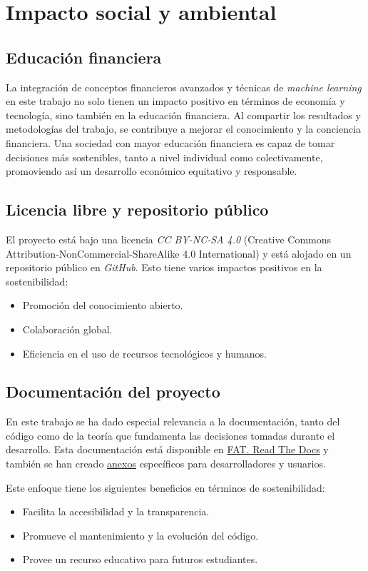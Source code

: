 \section{Impacto social y ambiental}

\subsection{Educación financiera}

La integración de conceptos financieros avanzados y técnicas de \emph{machine learning} en este trabajo no solo tienen un impacto positivo en términos de economía y tecnología, sino también en la educación financiera. Al compartir los resultados y metodologías del trabajo, se contribuye a mejorar el conocimiento y la conciencia financiera. Una sociedad con mayor educación financiera es capaz de tomar decisiones más sostenibles, tanto a nivel individual como colectivamente, promoviendo así un desarrollo económico equitativo y responsable.

\subsection{Licencia libre y repositorio público}

El proyecto está bajo una licencia \emph{CC BY-NC-SA 4.0} (Creative Commons Attribution-NonCommercial-ShareAlike 4.0 International) y está alojado en un repositorio público en \emph{GitHub}. Esto tiene varios impactos positivos en la sostenibilidad:

\begin{itemize}
\item
Promoción del conocimiento abierto.
\item
Colaboración global.
\item
Eficiencia en el uso de recursos tecnológicos y humanos.
\end{itemize}

\subsection{Documentación del proyecto}

En este trabajo se ha dado especial relevancia a la documentación, tanto del código como de la teoría que fundamenta las decisiones tomadas durante el desarrollo. Esta documentación está disponible en \href{https://fat.readthedocs.io/es/latest/intro.html}{FAT. Read The Docs} y también se han creado \href{https://github.com/rmt0009alu/FAT/blob/main/docs/latex/anexos.pdf}{anexos} específicos para desarrolladores y usuarios. 

Este enfoque tiene los siguientes beneficios en términos de sostenibilidad:

\begin{itemize}
\item
Facilita la accesibilidad y la transparencia.
\item
Promueve el mantenimiento y la evolución del código. 
\item
Provee un recurso educativo para futuros estudiantes. 
\end{itemize}
